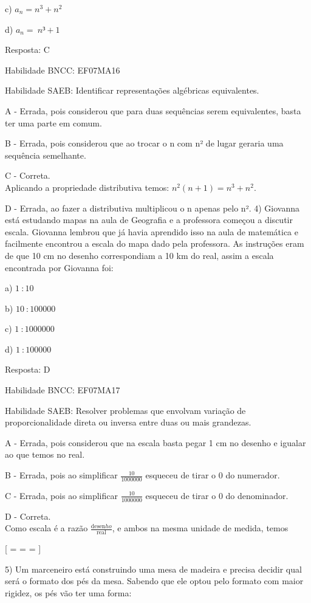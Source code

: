c) \(a_{n} = n^{3} + n^2\)

d) \(a_{n} = \ n³ + 1\)

Resposta: C

Habilidade BNCC: EF07MA16

Habilidade SAEB: Identificar representações algébricas equivalentes.

A - Errada, pois considerou que para duas sequências serem equivalentes,
basta ter uma parte em comum.

B - Errada, pois considerou que ao trocar o n com n² de lugar geraria
uma sequência semelhante.

C - Correta.\\
Aplicando a propriedade distributiva temos:
\(n^{2}\left( n + 1 \right) = n^{3} + n^{2}.\)

D - Errada, ao fazer a distributiva multiplicou o n apenas pelo n².
4) Giovanna está estudando mapas na aula de Geografia e a professora
começou a discutir escala. Giovanna lembrou que já havia aprendido isso
na aula de matemática e facilmente encontrou a escala do mapa dado pela
professora. As instruções eram de que 10 cm no desenho correspondiam a
10 km do real, assim a escala encontrada por Giovanna foi:

a) \(1\ :10\)

b) \(10\ :100000\)

c) \(1\ :1000000\)

d) \(1\ :100000\)

Resposta: D

Habilidade BNCC: EF07MA17

Habilidade SAEB: Resolver problemas que envolvam variação de
proporcionalidade direta ou inversa entre duas ou mais grandezas.

A - Errada, pois considerou que na escala basta pegar 1 cm no desenho e
igualar ao que temos no real.

B - Errada, pois ao simplificar \(\frac{10}{1000000}\) esqueceu de tirar
o 0 do numerador.

C - Errada, pois ao simplificar \(\frac{10}{1000000}\) esqueceu de tirar
o 0 do denominador.

D - Correta.\\
Como escala é a razão \(\frac{\text{desen}ho}{\text{real}}\), e ambos na
mesma unidade de medida, temos

[ =  =  = ]

5) Um marceneiro está construindo uma mesa de madeira e precisa decidir
qual será o formato dos pés da mesa. Sabendo que ele optou pelo formato
com maior rigidez, os pés vão ter uma forma:


